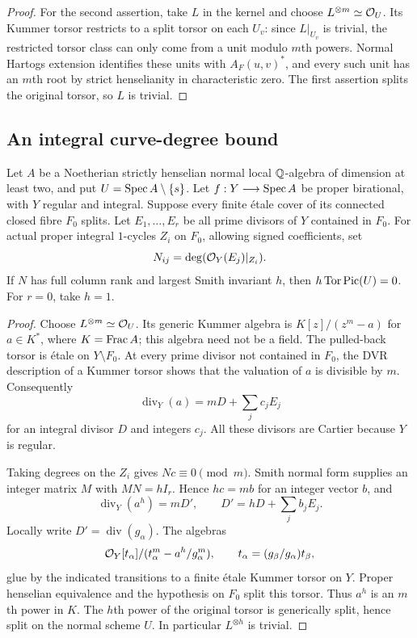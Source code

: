\begin{proof}
For the second assertion, take $L$ in the kernel and choose $L^{\otimes m}\simeq\mathcal O_U$. Its Kummer torsor restricts to a split torsor on each $U_v$: since $L|_{U_v}$ is trivial, the restricted torsor class can only come from a unit modulo $m$th powers. Normal Hartogs extension identifies these units with $A_F(u,v)^*$, and every such unit has an $m$th root by strict henselianity in characteristic zero. The first assertion splits the original torsor, so $L$ is trivial.
\end{proof}

\subsection{An integral curve-degree bound}
\begin{theorem}\label{tor:degrees}
Let $A$ be a Noetherian strictly henselian normal local $\mathbb Q$-algebra of dimension at least two, and put $U=\operatorname{Spec} A\setminus\{s\}$. Let $f:Y\longrightarrow\operatorname{Spec} A$ be proper birational, with $Y$ regular and integral. Suppose every finite \'etale cover of its connected closed fibre $F_0$ splits. Let $E_1,\ldots,E_r$ be all prime divisors of $Y$ contained in $F_0$. For actual proper integral $1$-cycles $Z_i$ on $F_0$, allowing signed coefficients, set
\[
 N_{ij}=\deg(\mathcal O_Y(E_j)|_{Z_i}).
\]
If $N$ has full column rank and largest Smith invariant $h$, then $h\operatorname{Tor}\operatorname{Pic}(U)=0$. For $r=0$, take $h=1$.
\end{theorem}
\begin{proof}
Choose $L^{\otimes m}\simeq\mathcal O_U$. Its generic Kummer algebra is $K[z]/(z^m-a)$ for $a\in K^*$, where $K=\operatorname{Frac} A$; this algebra need not be a field. The pulled-back torsor is \'etale on $Y\setminus F_0$. At every prime divisor not contained in $F_0$, the DVR description of a Kummer torsor shows that the valuation of $a$ is divisible by $m$. Consequently
\[
 \operatorname{div}_Y(a)=mD+\sum_jc_jE_j
\]
for an integral divisor $D$ and integers $c_j$. All these divisors are Cartier because $Y$ is regular.

Taking degrees on the $Z_i$ gives $Nc\equiv0\pmod m$. Smith normal form supplies an integer matrix $M$ with $MN=hI_r$. Hence $hc=mb$ for an integer vector $b$, and
\[
 \operatorname{div}_Y(a^h)=mD',
 \qquad D'=hD+\sum_jb_jE_j.
\]
Locally write $D'=\operatorname{div}(g_\alpha)$. The algebras
\[
 \mathcal O_Y[t_\alpha]/(t_\alpha^m-a^h/g_\alpha^m),
 \qquad t_\alpha=(g_\beta/g_\alpha)t_\beta,
\]
glue by the indicated transitions to a finite \'etale Kummer torsor on $Y$. Proper henselian equivalence \cite[Tag~0A48]{The26} and the hypothesis on $F_0$ split this torsor. Thus $a^h$ is an $m$th power in $K$. The $h$th power of the original torsor is generically split, hence split on the normal scheme $U$. In particular $L^{\otimes h}$ is trivial.
\end{proof}


